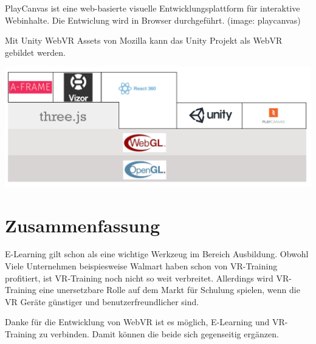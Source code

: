  PlayCanvas ist eine web-basierte visuelle Entwicklungsplattform für interaktive Webinhalte. Die Entwiclung wird in Browser durchgeführt.
 (image: playcanvas)
 
 Mit Unity WebVR Assets von Mozilla kann das Unity Projekt als WebVR gebildet werden.

\includegraphics[width=\textwidth]{images/webVRStruckture.png}

\section{Zusammenfassung}
E-Learning gilt schon als eine wichtige Werkzeug im Bereich Ausbildung. Obwohl Viele Unternehmen beispiesweise Walmart\citep{24} haben schon von VR-Training profitiert, ist VR-Training noch nicht so weit verbreitet. Allerdings wird VR-Training eine unersetzbare Rolle auf dem Markt für Schulung spielen, wenn die VR Geräte günstiger und benutzerfreundlicher sind.

Danke für die Entwicklung von WebVR ist es möglich, E-Learning und VR-Training zu verbinden. Damit können die beide sich gegenseitig ergänzen.


